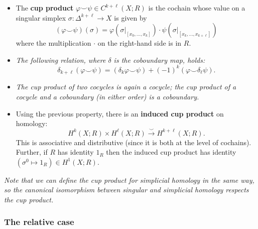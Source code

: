 \documentclass[10pt]{article}
\begin{document}
                \begin{itemize}
                    \item The \textbf{cup product} $\varphi\smallsmile\psi\in C^{k+\ell}(X;R)$ is the cochain whose value on a singular simplex $\sigma\colon\Delta^{k+\ell}\to X$ is given by
                        \begin{equation*}
                            (\varphi\smallsmile\psi)(\sigma)=\varphi(\sigma|_{[x_0,\ldots,x_k]})\cdot\psi(\sigma|_{[x_k,\ldots,x_{k+\ell}]})
                        \end{equation*}
                        where the multiplication $\cdot$ on the right-hand side is in $R$.
                    \item \emph{The following relation, where $\delta$ is the coboundary map, holds:}
                        \begin{equation*}
                            \delta_{k+\ell}(\varphi\smallsmile\psi)=(\delta_k\varphi\smallsmile\psi)+(-1)^k(\varphi\smallsmile\delta_\ell\psi).
                        \end{equation*}
                    \item \emph{The cup product of two cocycles is again a cocycle; the cup product of a cocycle and a coboundary (in either order) is a coboundary.}
                    \item Using the previous property, there is an \textbf{induced cup product} on homology:
                        \begin{equation*}
                            H^k(X;R)\times H^\ell(X;R)\xrightarrow{\smallsmile}H^{k+\ell}(X;R).
                        \end{equation*}
                        This is associative and distributive (since it is both at the level of cochains).
                        Further, if $R$ has identity $1_R$ then the induced cup product has identity $(\sigma^0\mapsto 1_R)\in H^1(X;R)$.
                \end{itemize}

                \emph{Note that we can define the cup product for simplicial homology in the same way, so the canonical isomorphism between singular and simplicial homology respects the cup product.}

            \subsubsection{The relative case}
\end{document}
